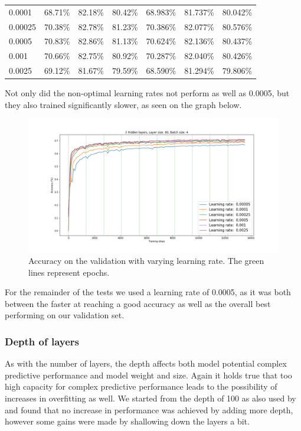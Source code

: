 \begin{table}[H]
\begin{tabular}{lcccccc}
\multicolumn{1}{l|}{0.0001} & 68.71\% & 82.18\% & \multicolumn{1}{c|}{80.42\%} & 68.983\% & 81.737\% & 80.042\% \\
\multicolumn{1}{l|}{0.00025} & 70.38\% & 82.78\% & \multicolumn{1}{c|}{81.23\%} & 70.386\% & 82.077\% & 80.576\% \\
\multicolumn{1}{l|}{0.0005} & 70.83\% & 82.86\% & \multicolumn{1}{c|}{81.13\%} & 70.624\% & 82.136\% & 80.437\% \\
\multicolumn{1}{l|}{0.001} & 70.66\% & 82.75\% & \multicolumn{1}{c|}{80.92\%} & 70.287\% & 82.040\% & 80.426\% \\
\multicolumn{1}{l|}{0.0025} & 69.12\% & 81.67\% & \multicolumn{1}{c|}{79.59\%} & 68.590\% & 81.294\% & 79.806\%
\end{tabular}
\end{table}
\noindent Not only did the non-optimal learning rates not perform as well as 0.0005, but they also trained significantly slower, as seen on the graph below.
\begin{figure}[H]
  \centering
  \includegraphics[width=\linewidth]{../graphs/new/learning_rate}
  \caption{Accuracy on the validation with varying learning rate. The green lines represent epochs.}
\end{figure}
For the remainder of the tests we used a learning rate of 0.0005, as it was both between the faster at reaching a good accuracy as well as the overall best performing on our validation set.

\subsubsection{Depth of layers}
As with the number of layers, the depth affects both model potential complex predictive performance and model weight and size. Again it holds true that too high capacity for complex predictive performance leads to the possibility of increases in overfitting as well. We started from the depth of 100 as also used by \citeauthor{wang-et-al-2016} and found that no increase in performance was achieved by adding more depth, however some gains were made by shallowing down the layers a bit.

